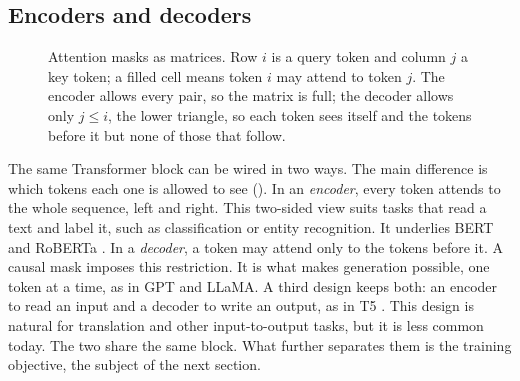 \subsection{Encoders and decoders}

\begin{figure}[t]
\centering
{}
\caption{Attention masks as matrices. Row $i$ is a query token and column $j$ a key
token; a filled cell means token $i$ may attend to token $j$. The encoder allows
every pair, so the matrix is full; the decoder allows only $j \le i$, the lower
triangle, so each token sees itself and the tokens before it but none of those that
follow.}
\label{fig:lm-attention}
\end{figure}

The same Transformer block can be wired in two ways. The main difference is
which tokens each one is allowed to see (). In an \emph{encoder}, every token attends
to the whole sequence, left and right. This two-sided view suits tasks that read a
text and label it, such as classification or entity recognition. It underlies
BERT \citep{devlin_bert_2019} and RoBERTa \citep{roberta}. In a \emph{decoder}, a
token may attend only to the tokens before it. A causal mask imposes this
restriction. It is what makes generation possible, one token at a time, as in GPT
\citep{Radford2018ImprovingLU} and LLaMA. A third design keeps both: an encoder to
read an input and a decoder to write an output, as in T5 \citep{raffel2020t5}. This
design is natural for translation and other input-to-output tasks, but it is less common
today. The two share the same block. What further separates them is the training
objective, the subject of the next section.


